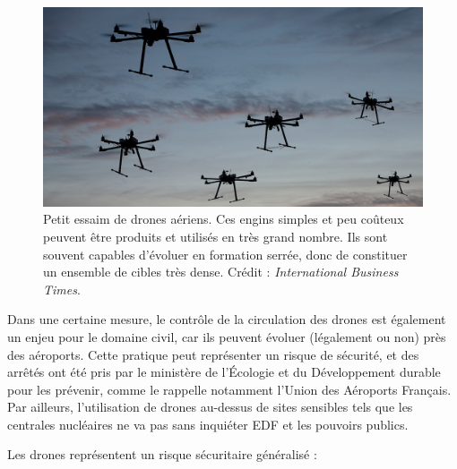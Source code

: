 	
	\begin{figure}[htb]
		\centering
		\includegraphics[width=\textwidth]{figures/ch1/swarm}
		\caption[Petit essaim de drones aériens]{Petit essaim de drones aériens. Ces engins simples et peu coûteux peuvent être produits et utilisés en très grand nombre. Ils sont souvent capables d'évoluer en formation serrée, donc de constituer un ensemble de cibles très dense. Crédit : \emph{International Business Times}\protect\footnotemark.}
		\label{fig:swarm}
	\end{figure}
	
	
	Dans une certaine mesure, le contrôle de la circulation des drones est également un enjeu pour le domaine civil, car ils peuvent évoluer (légalement ou non) près des aéroports. Cette pratique peut représenter un risque de sécurité, et des arrêtés ont été pris par le ministère de l'Écologie et du Développement durable pour les prévenir, comme le rappelle notamment l'Union des Aéroports Français\footnotemark. Par ailleurs, l'utilisation de drones au-dessus de sites sensibles tels que les centrales nucléaires ne va pas sans inquiéter EDF et les pouvoirs publics\footnotemark.
	
	\addtocounter{footnote}{-1}
	
	\addtocounter{footnote}{1}


	Les drones représentent un risque sécuritaire généralisé :
	
